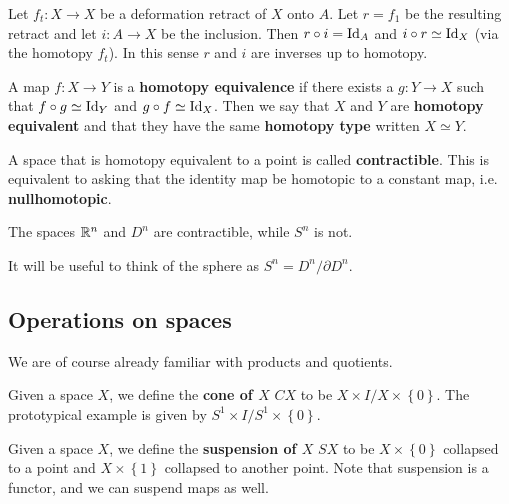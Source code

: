 \documentclass{../mathnotes}
\begin{document}
\begin{rem}
    Let $f_t:X\to X$ be a deformation retract of $X$ onto $A$. Let $r=f_1$ be the resulting retract and let $i:A\to X$ be
    the inclusion. Then $r\circ i=\operatorname{Id}_A$ and $i\circ r\simeq \operatorname{Id}_X$ (via the homotopy $f_t$). In this sense $r$ and $i$
    are inverses up to homotopy.
\end{rem}

\begin{defn}
    A map $f:X\to Y$ is a \textbf{homotopy equivalence} if there exists a $g:Y\to X$ such that $f\circ g\simeq\operatorname{Id}_Y$ and $g\circ f\simeq\operatorname{Id}_X$.
    Then we say that $X$ and $Y$ are \textbf{homotopy equivalent} and that they have the same \textbf{homotopy type} written $X\simeq Y$.
\end{defn}

\begin{defn}
    A space that is homotopy equivalent to a point is called \textbf{contractible}. This is equivalent to asking that the identity
    map be homotopic to a constant map, i.e. \textbf{nullhomotopic}.
\end{defn}

\begin{exmp}
    The spaces $\mathbb{R}^n$ and $D^n$ are contractible, while $S^n$ is not.
\end{exmp}

\begin{rem}
    It will be useful to think of the sphere as $S^n=D^n/\partial D^n$.
\end{rem}

\subsection{Operations on spaces}

We are of course already familiar with products and quotients.

\begin{defn}
    Given a space $X$, we define the \textbf{cone of $X$} $CX$ to be $X\times I/X\times\left\{ 0 \right\}$.
    The prototypical example is given by $S^1\times I/S^1\times \left\{ 0 \right\}$.
\end{defn}

\begin{defn}
    Given a space $X$, we define the \textbf{suspension of $X$} $SX$ to be $X\times \left\{ 0 \right\}$ collapsed to a point
    and $X\times \left\{ 1 \right\}$ collapsed to another point. Note that suspension is a functor, and we can suspend maps as
    well.
\end{defn}
\end{document}
